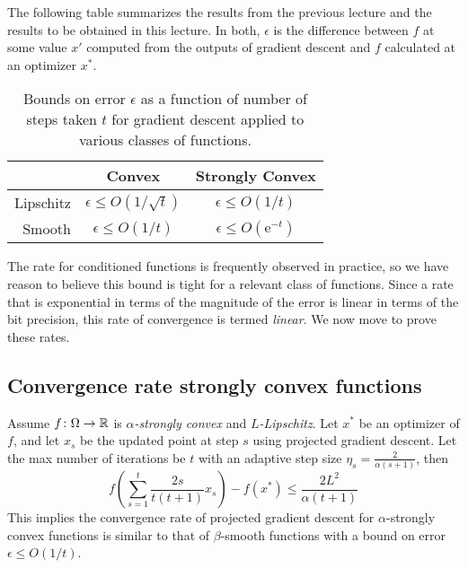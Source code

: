 The following table summarizes the results
from the previous lecture and the results
to be obtained in this lecture.
In both, $\epsilon$ is the difference between
$f$ at some value $x'$ computed
from the outputs of gradient descent and
$f$ calculated at an optimizer $x^*$.

\begin{table}[h]
    \centering
    \begin{tabular}{|r|c|c|}
        \hline
         & Convex & Strongly Convex\\
        \hline
         Lipschitz & $\epsilon \leq O(1/\sqrt{t})$
         & $\epsilon \leq O(1/t)$ \\
         \hline
         Smooth & $\epsilon \leq O(1/t)$
         & $\epsilon \leq O(\mathrm{e}^{-t})$ \\
         \hline
    \end{tabular}
    \caption{Bounds on error $\epsilon$
    as a function of number of steps taken $t$
    for gradient descent applied to various classes of functions.}
    \label{tab:proofs}
\end{table}

The rate for conditioned functions
is frequently observed in practice,
so we have reason to believe this bound is tight
for a relevant class of functions.
Since a rate that is exponential in terms of the
magnitude of the error
is linear in terms of the bit precision,
this rate of convergence is termed \emph{linear}.
We now move to prove these rates.

\subsection{Convergence rate strongly convex functions}

\begin{theorem} Assume $f\colon\Omega\to\mathbb{R}$ is \emph{$\alpha$-strongly convex} and \emph{$L$-Lipschitz}. Let $x^{*}$ be an optimizer of $f$, and let $x_{s}$ be the updated point at step $s$ using projected gradient descent. Let the max number of iterations be $t$ with an adaptive step size $\eta_{s} = \frac{2}{\alpha(s+1)}$, then
\[
f\left(\sum_{s=1}^{t}\frac{2s}{t(t+1)}x_{s}\right) - f(x^{*})\leq\frac{2 L^{2}}{\alpha(t+1)}
\]
This implies the convergence rate of projected gradient descent for $\alpha$-strongly convex functions is similar to that of $\beta$-smooth functions with a bound on error $\epsilon \leq O(1/t)$.
\end{theorem}

